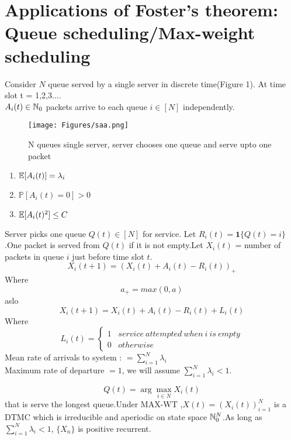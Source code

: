 \documentclass[a4paper,10pt,english]{article}
\begin{document}
\section{Applications of Foster's theorem: Queue scheduling/Max-weight scheduling}
Consider $N$ queue served by a single server in discrete time(Figure 1).
At time slot t = 1,2,3....\\
$A_i(t) \in \mathbb{N}_0$ packets arrive to each queue $i \in [N]$ independently.\\
\begin{figure}
\centering
\texttt{[image: Figures/saa.png]}
\caption{N queues single server, server chooses one queue and serve upto one packet}
\label{fig: example 1.1}
\end{figure}
\begin{enumerate}
\item $\mathbb{E}[A_i(t)] = \lambda _i$
\item $\mathbb{P}[A_i(t)=0] > 0$
\item $\mathbb{E}[A_i(t)^2] \leq C$
\end{enumerate}
Server picks one queue $Q(t) \in [N]$ for service. Let $R_i(t) =  \boldsymbol{1}\{Q(t) = i\}$.One packet is served from $Q(t)$ if it is not empty.Let $X_i(t)$ = number of packets in queue $i$ just before time slot $t$.\\
\[X_i(t+1) = (X_i(t) + A_i(t) - R_i(t))_+\]
Where \[a_+ = max(0,a)\]
aslo \[X_i(t+1) = X_i(t) + A_i(t) - R_i(t) + L_i(t)       \]Where 
\begin{equation*}
L_i(t) = 
\begin{cases}
  1 \ \ \ \,service \ attempted \ when \ i \ is \ empty\\
  0 \ \ \ \,otherwise 
\end{cases}
\end{equation*}
Mean rate of arrivals to system : $= \sum_{i=1}^{N} \lambda _i
$\\
Maximum rate of departure $= 1$, we will assume $ \sum_{i=1}^{N} \lambda _i < 1$.
\begin{thm}
\[Q(t) = \arg \max _{i \in N} X_i(t)  \] 
that is serve  the longest queue.Under MAX-WT ,$X(t) = (X_i(t))_{i=1}^{N}$ is a DTMC which is irreducible and aperiodic on state space $\mathbb{N}_0^N$.As long as $\sum_{i=1}^{N} \lambda _i < 1$, $\{X_n\}$ is positive recurrent.
\end{thm}
\end{document}
